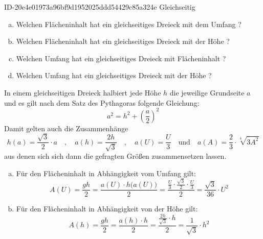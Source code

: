 \begin{exercise}
      {ID-20e4e01973a96bf9d1952025ddd54429c85a324e}
      {Gleichseitig}
  \ifproblem\problem
    \begin{enumerate}[a)]
      \squeeze
      \item Welchen Flächeninhalt hat ein gleichseitiges Dreieck mit dem Umfang ?
      \item Welchen Flächeninhalt hat ein gleichseitiges Dreieck mit der Höhe ?
      \item Welchen Umfang hat ein gleichseitiges Dreieck mit Flächeninhalt ?
      \item Welchen Umfang hat ein gleichseitiges Dreieck mit der Höhe ?
    \end{enumerate}
  \fi
  \ifoutline\outline
    In einem gleichseitigen Dreieck halbiert jede Höhe $h$ die jeweilige
    Grundseite $a$ und es gilt nach dem Satz des Pythagoras folgende Gleichung:
    \begin{equation*}
      a^2=h^2+\left(\frac{a}{2}\right)^2
    \end{equation*}
    Damit gelten auch die Zusammenhänge
    \begin{equation*}
      h(a)=\frac{\sqrt{3}}{2}\cdot a
      \quad,\quad
      a(h)=\frac{2h}{\sqrt{3}}
      \quad,\quad
      a(U)=\frac{U}{3}
      \quad\text{und}\quad
      a(A)=\frac{2}{3}\cdot\sqrt[4]{3A^2}
    \end{equation*}
    aus denen sich sich dann die gefragten Größen zusammensetzen lassen.
    \begin{enumerate}[a)]
      \item Für den Flächeninhalt in Abhängigkeit vom Umfang gilt:
            \begin{equation*}
              A(U)
              =
              \frac{gh}{2}
              =
              \frac{a(U)\cdot h\big(a(U)\big)}{2}
              =
              \frac{\frac{U}{3}\cdot\frac{\sqrt{3}}{2}\cdot\frac{U}{3}}{2}
              =
              \frac{\sqrt{3}}{36}\cdot U^2
            \end{equation*}
      \item Für den Flächeninhalt in Abhängigkeit von der Höhe gilt:
            \begin{equation*}
              A(h)
              =
              \frac{gh}{2}
              =
              \frac{a(h)\cdot h}{2}
              =
              \frac{\frac{2h}{\sqrt{3}}\cdot h}{2}
              =
              \frac{1}{\sqrt{3}}\cdot h^2
            \end{equation*}

\end{enumerate}
\end{exercise}
